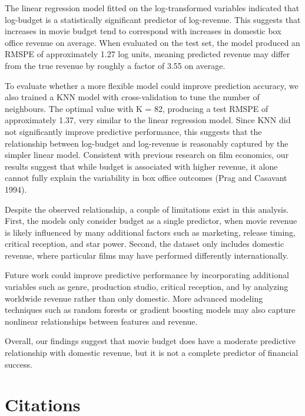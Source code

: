 \documentclass[
  letterpaper,
  DIV=11,
  numbers=noendperiod]{scrartcl}
\begin{document}
The linear regression model fitted on the log-transformed variables
indicated that log-budget is a statistically significant predictor of
log-revenue. This suggests that increases in movie budget tend to
correspond with increases in domestic box office revenue on average.
When evaluated on the test set, the model produced an RMSPE of
approximately 1.27 log units, meaning predicted revenue may differ from
the true revenue by roughly a factor of 3.55 on average.

To evaluate whether a more flexible model could improve prediction
accuracy, we also trained a KNN model with cross-validation to tune the
number of neighbours. The optimal value with K = 82, producing a test
RMSPE of approximately 1.37, very similar to the linear regression
model. Since KNN did not significantly improve predictive performance,
this suggests that the relationship between log-budget and log-revenue
is reasonably captured by the simpler linear model. Consistent with
previous research on film economics, our results suggest that while
budget is associated with higher revenue, it alone cannot fully explain
the variability in box office outcomes (Prag and Casavant 1994).

Despite the observed relationship, a couple of limitations exist in this
analysis. First, the models only consider budget as a single predictor,
when movie revenue is likely influenced by many additional factors such
as marketing, release timing, critical reception, and star power.
Second, the dataset only includes domestic revenue, where particular
films may have performed differently internationally.

Future work could improve predictive performance by incorporating
additional variables such as genre, production studio, critical
reception, and by analyzing worldwide revenue rather than only domestic.
More advanced modeling techniques such as random forests or gradient
boosting models may also capture nonlinear relationships between
features and revenue.

Overall, our findings suggest that movie budget does have a moderate
predictive relationship with domestic revenue, but it is not a complete
predictor of financial success.

\section*{Citations}\label{citations}
\end{document}
